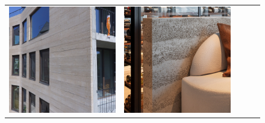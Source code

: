 \begin{figure}[H]
{\begin{tabular}{@{}ccccc@{}}
      \includegraphics[width=\linewidth]{Images/LoRAs/STAMPBETON/Training_images/6.jpg} &
      \includegraphics[width=\linewidth]{Images/LoRAs/STAMPBETON/Training_images/7.jpg} &

\end{tabular}}
\end{figure}

